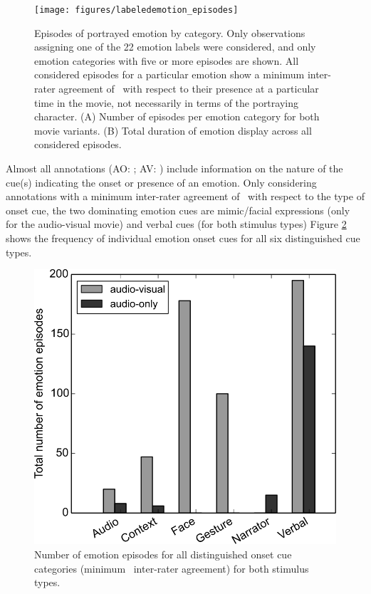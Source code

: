 \begin{figure}
  \centering
  \texttt{[image: figures/labeledemotion\_episodes]}
  \caption{Episodes of portrayed emotion by category. Only observations assigning
    one of the 22 emotion labels were considered, and only emotion categories
    with five or more episodes are shown. All considered episodes for a particular emotion
    show a minimum inter-rater agreement of \AVAggThresh\ with respect to their
    presence at a particular time in the movie, not necessarily in terms of the
    portraying character. (A) Number of episodes
    per emotion category for both movie variants. (B) Total duration of emotion
    display across all considered episodes.}
  \label{fig:threshlabeledemotion}
\end{figure}

Almost all annotations (AO: \AOFracWithLabeledOncue; AV:
\AVFracWithLabeledOncue) include information on the nature of the cue(s)
indicating the onset or presence of an emotion. Only considering annotations
with a minimum inter-rater agreement of \AVAggThresh\ with respect to the type
of onset cue, the two dominating emotion cues are mimic/facial expressions
(only for the audio-visual movie) and verbal cues (for both stimulus types)
Figure \ref{fig:threshlabeledoncue} shows the frequency of individual emotion
onset cues for all six distinguished cue types.


\begin{figure}
  \centering
  \includegraphics[width=\linewidth]{figures/labeledoncue_episodes}
  \caption{Number of emotion episodes for all distinguished onset cue categories
    (minimum \AVAggThresh\ inter-rater agreement) for both stimulus types.}
  \label{fig:threshlabeledoncue}
\end{figure}


